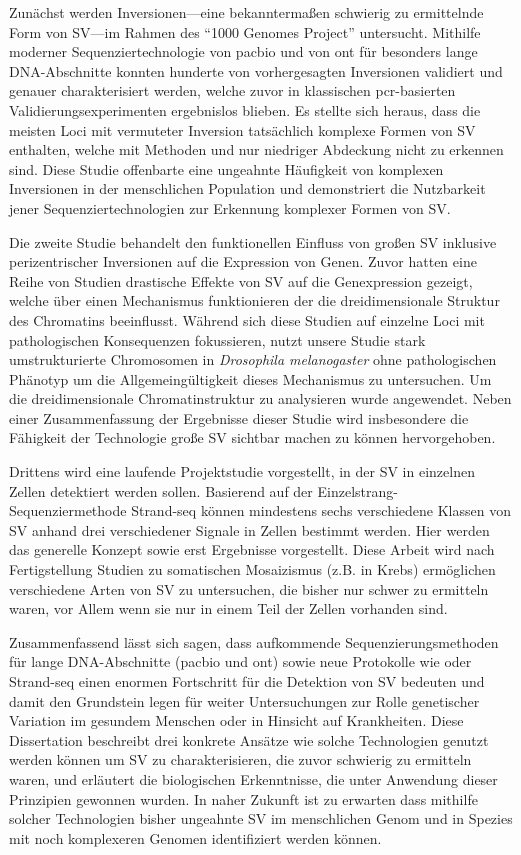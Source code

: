 Zunächst werden Inversionen--–eine bekanntermaßen schwierig zu ermittelnde Form
von SV---im Rahmen des ``1000 Genomes Project'' untersucht. Mithilfe moderner
Sequenziertechnologie von \acl{pacbio} und von \acl{ont} für besonders lange
DNA\--Ab\-schnit\-te konnten hunderte von vorhergesagten Inversionen validiert und
genauer cha\-rak\-te\-ri\-siert werden, welche zuvor in klassischen \acs{pcr}-basierten
Validierungsexperimenten ergebnislos blieben. Es stellte sich heraus, dass die
meis\-ten Loci mit vermuteter Inversion tatsächlich komplexe Formen von SV
enthalten, welche mit \mps Methoden und nur niedriger Abdeckung nicht zu
erkennen sind. Diese Studie offenbarte eine ungeahnte Häufigkeit von komplexen
Inversionen in der menschlichen Population und demonstriert die Nutzbarkeit
jener Sequenziertechnologien zur Erkennung komplexer Formen von SV.

Die zweite Studie behandelt den funktionellen Einfluss von großen SV
inklusive perizentrischer Inversionen auf die Expression von Genen.
Zuvor hatten eine Reihe von Studien drastische Effekte von SV auf die
Genexpression gezeigt, welche über einen Mechanismus funktionieren der die
dreidimensionale Struktur des Chromatins beeinflusst. Während sich diese Studien
auf einzelne Loci mit pathologischen Konsequenzen fokussieren, nutzt unsere
Studie stark umstrukturierte Chromosomen in \textit{Drosophila melanogaster}
ohne pathologischen Phänotyp um die Allgemeingültigkeit dieses Mechanismus zu
untersuchen. Um die dreidimensionale Chromatinstruktur zu analysieren wurde \hic
angewendet. Neben einer Zusammenfassung der Ergebnisse dieser Studie wird
insbesondere die Fähigkeit der \hic Technologie große SV sichtbar machen zu
können hervorgehoben.

Drittens wird eine laufende Projektstudie vorgestellt, in der SV in einzelnen
Zellen detektiert werden sollen. Basierend auf der
Ein\-zel\-strang-Se\-quen\-zier\-me\-tho\-de
Strand-seq können mindestens sechs verschiedene Klas\-sen von SV anhand drei
verschiedener Signale in Zellen bestimmt werden. Hier werden das generelle
Konzept sowie erst Ergebnisse vorgestellt. Diese Arbeit wird nach Fertigstellung
Studien zu somatischen Mosaizismus (z.B. in Krebs) ermöglichen verschiedene
Arten von SV zu untersuchen, die bisher nur schwer zu ermitteln waren, vor Allem
wenn sie nur in einem Teil der Zellen vorhanden sind.

Zusammenfassend lässt sich sagen, dass aufkommende Sequenzierungsmethoden für
lange DNA-Ab\-schnit\-te (\acl{pacbio} und \acl{ont}) sowie neue Protokolle wie
\hic oder Strand-seq einen enormen Fortschritt für die Detektion von SV bedeuten
und damit den Grundstein legen für weiter Untersuchungen zur Rolle genetischer
Variation im gesundem Menschen oder in Hinsicht auf Krankheiten. Diese
Dissertation beschreibt drei konkrete Ansätze wie solche Technologien genutzt
werden können um SV zu charakterisieren, die zuvor schwierig zu ermitteln waren,
und erläutert die biologischen Erkenntnisse, die unter Anwendung dieser
Prinzipien gewonnen wurden. In naher Zukunft ist zu erwarten dass mithilfe
solcher Technologien bisher ungeahnte SV im menschlichen Genom und in Spezies
mit noch komplexeren Genomen identifiziert werden können.
